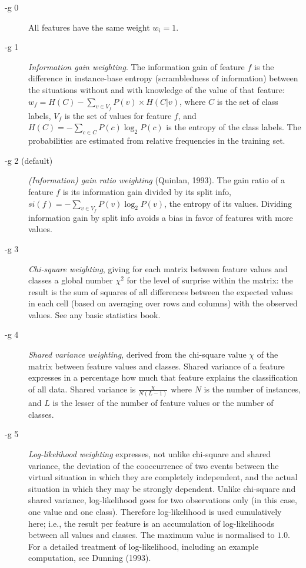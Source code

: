 \documentclass[11pt]{article}
\begin{document}
\begin{description}
\item[-g 0] All features have the same weight $w_{i}=1$.
\item[-g 1] {\em Information gain weighting}. The information gain of
feature $f$ is the difference in instance-base entropy (scrambledness
of information) between the situations without and with knowledge of
the value of that feature: $w_{f} = H(C) - \sum_{v \in V_{f}} P(v)
\times H(C|v)$, where $C$ is the set of class labels, $V_{f}$ is the
set of values for feature $f$, and $H(C) = - \sum_{c \in C} P(c)
\log_{2} P(c)$ is the entropy of the class labels. The probabilities
are estimated from relative frequencies in the training set.
\item[-g 2 (default)] {\em (Information) gain ratio weighting}
(Quinlan, 1993). The gain ratio of a feature $f$ is its information
gain divided by its split info, $si(f)= - \sum_{v \in V_{f}} P(v)
\log_{2} P(v)$, the entropy of its values. Dividing information gain
by split info avoids a bias in favor of features with more values.
\item[-g 3] {\em Chi-square weighting}, giving for each matrix between
feature values and classes a global number $\chi^{2}$ for the level of
surprise within the matrix: the result is the sum of squares of all
differences between the expected values in each cell (based on
averaging over rows and columns) with the observed values. See any
basic statistics book.
\item[-g 4] {\em Shared variance weighting}, derived from the
chi-square value $\chi$ of the matrix between feature values and
classes. Shared variance of a feature expresses in a percentage how
much that feature explains the classification of all data. Shared
variance is $\frac{\chi}{N (L - 1)}$ where $N$ is the number of
instances, and $L$ is the lesser of the number of feature values or
the number of classes.
\item[-g 5] {\em Log-likelihood weighting} expresses, not unlike
chi-square and shared variance, the deviation of the cooccurrence of
two events between the virtual situation in which they are completely
independent, and the actual situation in which they may be strongly
dependent. Unlike chi-square and shared variance, log-likelihood goes
for two observations only (in this case, one value and one
class). Therefore log-likelihood is used cumulatively here; i.e., the
result per feature is an accumulation of log-likelihoods between all
values and classes. The maximum value is normalised to $1.0$. For a
detailed treatment of log-likelihood, including an example
computation, see Dunning (1993).
\end{description}
\ \\
\end{document}
